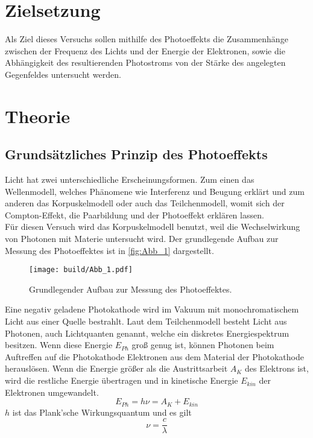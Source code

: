 \section{Zielsetzung}
\label{sec:Zielsetzung}
Als Ziel dieses Versuchs sollen mithilfe des Photoeffekts die Zusammenhänge zwischen der Frequenz
des Lichts und der Energie der Elektronen, sowie die Abhängigkeit des resultierenden
Photostroms von der Stärke des angelegten Gegenfeldes untersucht werden.
\section{Theorie}
\label{sec:Theorie}
\subsection{Grundsätzliches Prinzip des Photoeffekts}
\label{Grundsätzliche_theo}
Licht hat zwei unterschiedliche Erscheinungsformen. Zum einen das Wellenmodell,
welches Phänomene wie Interferenz und Beugung erklärt und zum anderen das Korpuskelmodell oder
auch das Teilchenmodell, womit sich der Compton-Effekt, die Paarbildung und der Photoeffekt erklären lassen.\\
Für diesen Versuch wird das Korpuskelmodell benutzt, weil die Wechselwirkung von Photonen mit Materie untersucht wird.
Der grundlegende Aufbau zur Messung des Photoeffektes ist in \autoref{fig:Abb_1} dargestellt.
\begin{figure}[H]
    \centering
    \texttt{[image: build/Abb\_1.pdf]}
    \caption{Grundlegender Aufbau zur Messung des Photoeffektes.\cite{V500}}
    \label{fig:Abb_1}
\end{figure}
Eine negativ geladene Photokathode wird im Vakuum mit monochromatischem Licht aus einer Quelle bestrahlt.
Laut dem Teilchenmodell besteht Licht aus Photonen, auch Lichtquanten genannt, welche ein diskretes
Energiespektrum besitzen. Wenn diese Energie $E_{Ph}$ groß genug ist, können Photonen beim Auftreffen auf die Photokathode
Elektronen aus dem Material der Photokathode herauslösen.
Wenn die Energie größer als die Austrittsarbeit $A_K$ des Elektrons ist, wird die restliche Energie übertragen 
und in kinetische Energie $E_{kin}$ der Elektronen umgewandelt.
\begin{equation}
    E_{Ph} = h\nu = A_K + E_{kin}
    \label{eqn:Energie}
\end{equation}
$h$ ist das Plank'sche Wirkungsquantum und es gilt
\begin{equation}
    \nu = \frac{c}{\lambda}
    \label{eqn:Frequenz}
\end{equation}
